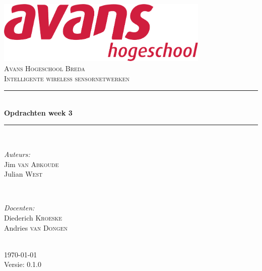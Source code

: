 \documentclass[12pt]{article}
\begin{document}
\begin{titlepage}
\newcommand{\HRule}{\rule{\linewidth}{0.5mm}} %

\center %

\includegraphics[height=3cm]{avans}\\%
\textsc{\Large Avans Hogeschool Breda}\\[0.5cm] %
\textsc{\large Intelligente wireless sensornetwerken}\\[0.5cm] %
\HRule \\[0.4cm]
{ \huge \bfseries Opdrachten week 3}\\[0.4cm] %
\HRule \\[1.5cm]

\begin{minipage}{0.4\textwidth}
\begin{flushleft} \large
\emph{Auteurs:}\\
Jim \textsc{van Abkoude} \\
Julian \textsc{West} \\
\end{flushleft}
\end{minipage}
~
\begin{minipage}{0.4\textwidth}
\begin{flushright} \large
\emph{Docenten:} \\
Diederich \textsc{Kroeske} \\ %
Andries \textsc{van Dongen} \\ %
\end{flushright}
\end{minipage}\\[4cm]

{\large \today}\\[3cm] %

Versie: 0.1.0

\vfill %

\end{titlepage}
\end{document}
